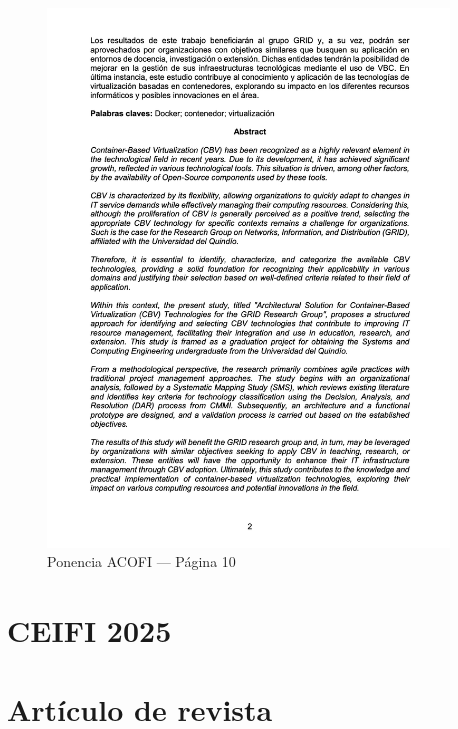 \begin{figure}[H]
    \centering
    \begin{tcolorbox}[
        colback=white,
        colframe=gray!50,
        boxrule=1pt,
        arc=2pt,
        boxsep=5pt,
        left=3pt,
        right=3pt,
        top=3pt,
        bottom=3pt,
        drop shadow
    ]
        \includegraphics[width=0.95\textwidth,keepaspectratio]{apendices/ACOFI/pagina_10.png}
    \end{tcolorbox}
    \caption{Ponencia ACOFI --- Página 10}\label{fig:acofi-pagina-10}
\end{figure}
\FloatBarrier\section{CEIFI 2025}

\section{Artículo de revista}

